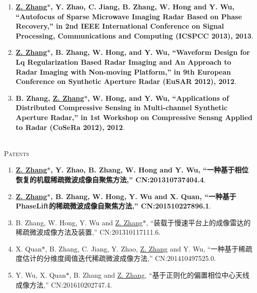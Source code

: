 \documentclass[paper=a4,fontsize=11pt]{scrartcl}
\begin{document}
\begin{enumerate}
	\item \textbf{\underline{Z. Zhang$\ast$}, Y. Zhao, C. Jiang, B. Zhang, W. Hong and Y. Wu, ``Autofocus of Sparse Microwave Imaging Radar Based on Phase Recovery,'' in 2nd IEEE International Conference on Signal Processing, Communications and Computing (ICSPCC 2013), 2013}.
	
	\item \textbf{\underline{Z. Zhang$\ast$}, B. Zhang, W. Hong, and Y. Wu, ``Waveform Design for Lq Regularization Based Radar Imaging and An Approach to Radar Imaging with Non-moving Platform,'' in 9th European Conference on Synthetic Aperture Radar (EuSAR 2012), 2012}.
	
	\item \textbf{B. Zhang, \underline{Z. Zhang$\ast$}, W. Hong, and Y. Wu, ``Applications of Distributed Compressive Sensing in Multi-channel Synthetic Aperture Radar,'' in 1st Workshop on Compressive Sensng Applied to Radar (CoSeRa 2012), 2012}.
	
\end{enumerate}

~\\
\textsc{Patents}

\begin{enumerate}
	
	\item \textbf{\underline{Z. Zhang$\ast$}, Y. Zhao, B. Zhang, W. Hong and Y. Wu, ``一种基于相位恢复的机载稀疏微波成像自聚焦方法,'' CN:201310737404.4}.
	
	\item \textbf{\underline{Z. Zhang$\ast$}, B. Zhang, W. Hong, Y. Wu and X. Quan, ``一种基于PhaseLift的稀疏微波成像自聚焦方法,'' CN:201510227896.1}.
	
	\item B. Zhang, W. Hong, Y. Wu and \underline{Z. Zhang$\ast$}, ``装载于慢速平台上的成像雷达的稀疏微波成像方法及装置,'' CN:201310117111.6.
	
	\item X. Quan$\ast$, B. Zhang, C. Jiang, Y. Zhao, \underline{Z. Zhang} and Y. Wu, ``一种基于稀疏度估计的分维度阈值迭代稀疏微波成像方法,'' CN:201410497525.0.
	
	\item Y. Wu, X. Quan$\ast$, B. Zhang and \underline{Z. Zhang}, ``基于正则化的偏置相位中心天线成像方法,'' CN:201610202747.4.
	
\end{enumerate}
\end{document}
